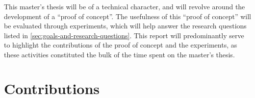 This master's thesis will be of a technical character, and will revolve around the development of a \enquote{proof of concept}. The usefulness of this \enquote{proof of concept} will be evaluated through experiments, which will help answer the research questions listed in \autoref{sec:goals-and-research-questions}. This report will predominantly serve to highlight the contributions of the proof of concept and the experiments, as these activities constituted the bulk of the time spent on the master's thesis.

\section{Contributions}
\label{sec:intro-contributions}

\begin{comment}
This section just provides a brief summary of the main contributions of the work.
The main description of the contributions will come in Section~\ref{sec:contributions}, after the results are presented.
(Hence Section~\ref{sec:introContributions} can also be left out, leaving the discussion completely to Section~\ref{sec:contributions}.)

The format of this section will generally be as follows:

\begin{enumerate}
    \item \textit{Lorem ipsum dolor sit amet, consectetur adipiscing elit.}
    \item \textit{Lorem ipsum dolor sit amet, consectetur adipiscing elit.}
    \item \textit{Lorem ipsum dolor sit amet, consectetur adipiscing elit.}
\end{enumerate}

\noindent
where the items on the list briefly describe the key contributions.

The order of the contributions here is important. List your main contribution first!
Creating this list will help you not only with writing the Conclusion (where all items listed here definitely should be included, and in more detail),
but also with items that need to be mentioned in the Abstract, as well as with points that you will want to bring to attention in the Discussion.
Hence most of the content on this list will be addressed 4--5 times in your text: here, in the Abstract, Discussion, Conclusion, and (most likely)
in the Results chapter.
\end{comment}

